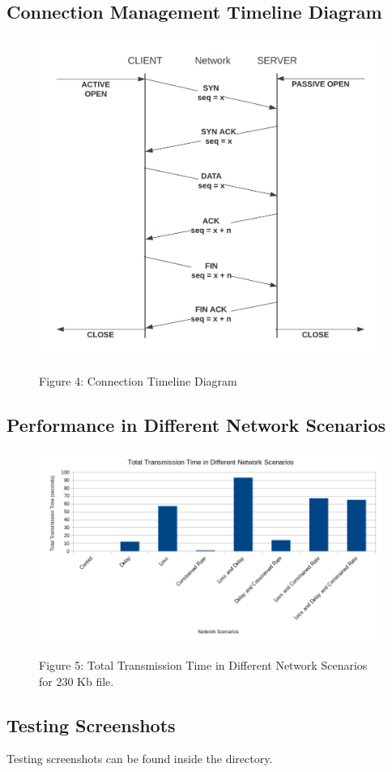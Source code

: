 \subsection{Connection Management Timeline Diagram}
\begin{figure}[H]
\begin{center}
\includegraphics[width=170mm]{images/timeline.png}
\end{center}
\begin{center}
    Figure 4: Connection Timeline Diagram
\end{center}
\end{figure}


\subsection{Performance in Different Network Scenarios}
\begin{figure}[H]
\begin{center}
\includegraphics[width=170mm]{images/performance-network-scenarios.png}
\end{center}
\begin{center}
    Figure 5: Total Transmission Time in Different Network Scenarios for 230 Kb file.        
\end{center}
\end{figure}

\newpage
\subsection{Testing Screenshots}
\label{testing-screenshots}
Testing screenshots can be found inside the  directory.
